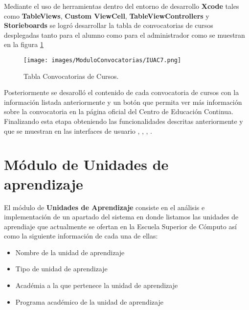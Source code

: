 Mediante el uso de herramientas dentro del entorno de desarrollo \textbf{Xcode} tales como \textbf{TableViews}, \textbf{Custom ViewCell}, \textbf{TableViewControllers} y \textbf{Storieboards} se logró desarrollar la tabla de convocatorias de cursos desplegadas tanto para el alumno como para el administrador como se muestran en la figura \ref{ConvCursos}

\begin{figure}[h!]
	\begin{center}
		\texttt{[image: images/ModuloConvocatorias/IUAC7.png]}
		\caption{Tabla Convocatorias de Cursos.}
		\label{ConvCursos}
	\end{center}
\end{figure}

Posteriormente se desarolló el contenido de cada convocatoria de cursos con la información listada anteriormente y un botón que permita ver más información sobre la convocatoria en la página oficial del Centro de Educación Continua. \\

Finalizando esta etapa obteniendo las funcionalidades descritas anteriormente y que se muestran en las interfaces de usuario , , , . \\

 \section{Módulo de Unidades de aprendizaje}
 El módulo de \textbf{Unidades de Aprendizaje} consiste en el análisis e implementación de un apartado del sistema en donde listamos las unidades de aprendiaje que actualmente se ofertan en la Escuela Superior de Cómputo así como la siguiente información de cada una de ellas:
 \begin{itemize}
 	\item Nombre de la unidad de aprendizaje
 	\item Tipo de unidad de aprendizaje
 	\item Académia a la que pertenece la unidad de aprendizaje
 	\item Programa académico de la unidad de aprendizaje
 \end{itemize}  
 
